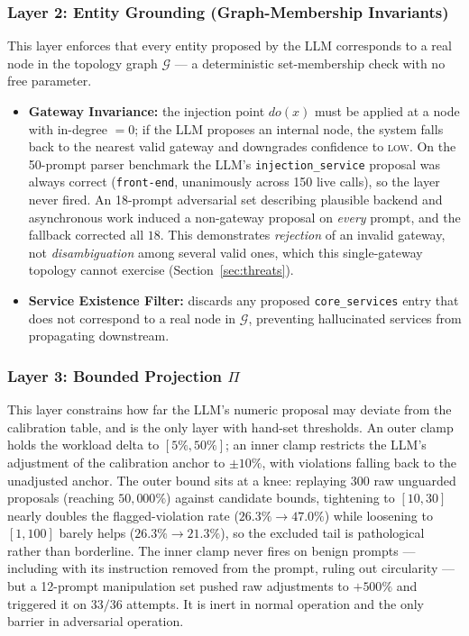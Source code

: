 \documentclass[journal, 10pt]{IEEEtran}
\begin{document}
\subsubsection{Layer 2: Entity Grounding (Graph-Membership Invariants)}
\label{sec:entity-grounding}
This layer enforces that every entity proposed by the LLM corresponds to a real node in the topology graph $\mathcal{G}$ --- a deterministic set-membership check with no free parameter.
\begin{itemize}
    \item \textbf{Gateway Invariance:} the injection point $do(x)$ must be applied at a node with in-degree $= 0$; if the LLM proposes an internal node, the system falls back to the nearest valid gateway and downgrades confidence to \textsc{low}. On the 50-prompt parser benchmark the LLM's \texttt{injection\_service} proposal was always correct (\texttt{front-end}, unanimously across 150 live calls), so the layer never fired. An 18-prompt adversarial set describing plausible backend and asynchronous work induced a non-gateway proposal on \emph{every} prompt, and the fallback corrected all $18$. This demonstrates \emph{rejection} of an invalid gateway, not \emph{disambiguation} among several valid ones, which this single-gateway topology cannot exercise (Section~\ref{sec:threats}).
    \item \textbf{Service Existence Filter:} discards any proposed \texttt{core\_services} entry that does not correspond to a real node in $\mathcal{G}$, preventing hallucinated services from propagating downstream.
\end{itemize}

\subsubsection{Layer 3: Bounded Projection $\Pi$}
\label{sec:bounded-projection}
This layer constrains how far the LLM's numeric proposal may deviate from the
calibration table, and is the only layer with hand-set thresholds. An outer clamp
holds the workload delta to $[5\%,50\%]$; an inner clamp restricts the LLM's
adjustment of the calibration anchor to $\pm10\%$, with violations falling back to
the unadjusted anchor. The outer bound sits at a knee: replaying 300 raw
unguarded proposals (reaching $50{,}000\%$) against candidate bounds, tightening
to $[10,30]$ nearly doubles the flagged-violation rate ($26.3\%\to47.0\%$) while
loosening to $[1,100]$ barely helps ($26.3\%\to21.3\%$), so the excluded tail is
pathological rather than borderline. The inner clamp never fires on benign
prompts --- including with its instruction removed from the prompt, ruling out
circularity --- but a 12-prompt manipulation set pushed raw adjustments to
$+500\%$ and triggered it on $33/36$ attempts. It is inert in normal operation
and the only barrier in adversarial operation.
\end{document}
